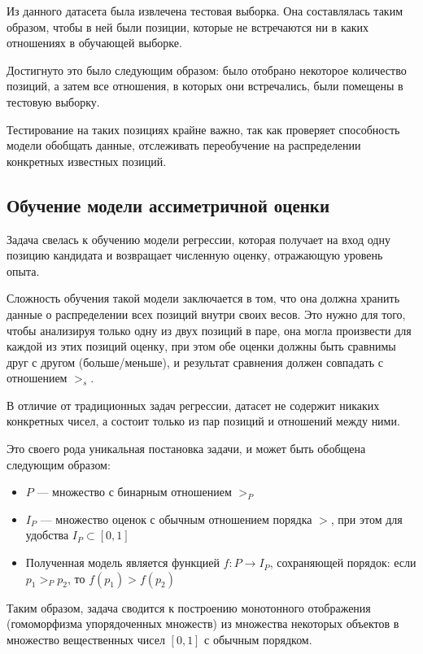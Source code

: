 \documentclass[14pt]{mmcs_article}
\begin{document}
Из данного датасета была извлечена тестовая выборка. Она составлялась таким образом, чтобы в ней были позиции, которые не встречаются ни в каких отношениях в обучающей выборке.

Достигнуто это было следующим образом: было отобрано некоторое количество позиций, а затем все отношения, в которых они встречались, были помещены в тестовую выборку.

Тестирование на таких позициях крайне важно, так как проверяет способность модели обобщать данные, отслеживать переобучение на распределении конкретных известных позиций.

\subsection{Обучение модели ассиметричной оценки}

Задача свелась к обучению модели регрессии, которая получает на вход одну позицию кандидата и возвращает численную оценку, отражающую уровень опыта.

Сложность обучения такой модели заключается в том, что она должна хранить данные о распределении всех позиций внутри своих весов. Это нужно для того, чтобы анализируя только одну из двух позиций в паре, она могла произвести для каждой из этих позиций оценку, при этом обе оценки должны быть сравнимы друг с другом (больше/меньше), и результат сравнения должен совпадать с отношением $>_{s}$.

В отличие от традиционных задач регрессии, датасет не содержит никаких конкретных чисел, а состоит только из пар позиций и отношений между ними.

Это своего рода уникальная постановка задачи, и может быть обобщена следующим образом:

\begin{itemize}
  \item $P$ --- множество с бинарным отношением $>_{P}$
  \item $I_{P}$ --- множество оценок с обычным отношением порядка $>$, при этом для удобства $I_{P} \subset [0, 1]$
  \item Полученная модель является функцией $f: P \rightarrow I_{P}$, сохраняющей порядок: если $p_{1} >_{P} p_{2}$, то $f(p_{1}) > f(p_{2})$
\end{itemize}

Таким образом, задача сводится к построению монотонного отображения (гомоморфизма упорядоченных множеств) из множества некоторых объектов в множество вещественных чисел $[0, 1]$ с обычным порядком.
\end{document}
